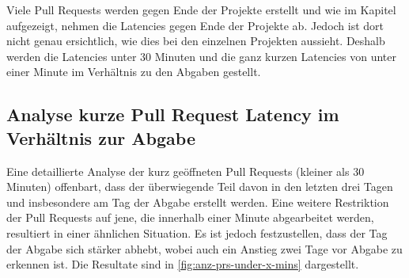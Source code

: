 Viele Pull Requests werden gegen Ende der Projekte erstellt und wie im Kapitel  aufgezeigt, nehmen die Latencies gegen Ende der Projekte ab. Jedoch ist dort nicht genau ersichtlich, wie dies bei den einzelnen Projekten aussieht. Deshalb werden die Latencies unter 30 Minuten und die ganz kurzen Latencies von unter einer Minute im Verhältnis zu den Abgaben gestellt.

\subsection{Analyse kurze Pull Request Latency im Verhältnis zur Abgabe }
Eine detaillierte Analyse der kurz geöffneten Pull Requests (kleiner als 30 Minuten) offenbart, dass der überwiegende Teil davon in den letzten drei Tagen und insbesondere am Tag der Abgabe erstellt werden. Eine weitere Restriktion der Pull Requests auf jene, die innerhalb einer Minute abgearbeitet werden, resultiert in einer ähnlichen Situation. Es ist jedoch festzustellen, dass der Tag der Abgabe sich stärker abhebt, wobei auch ein Anstieg zwei Tage vor Abgabe zu erkennen ist.  Die Resultate sind in \autoref{fig:anz-prs-under-x-mins} dargestellt.

